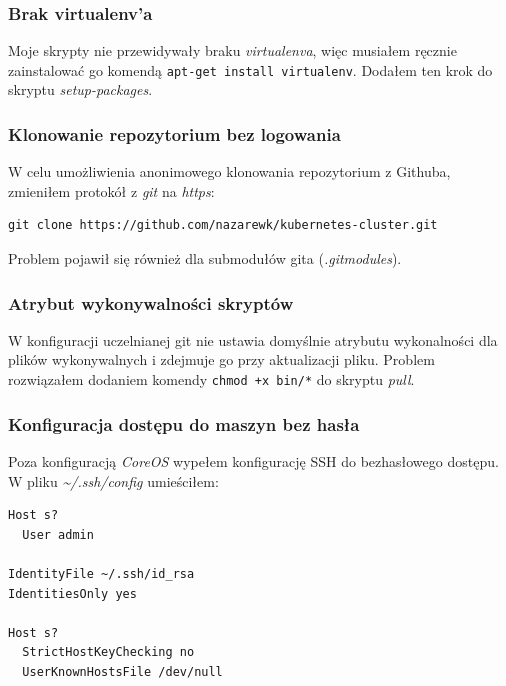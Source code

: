 \documentclass[a4paper,12pt,twoside,openany]{report}
\newcommand{\passthrough}[1]{#1}
\begin{document}
\hypertarget{brak-virtualenva}{%
\subsubsection{Brak virtualenv'a}\label{brak-virtualenva}}

Moje skrypty nie przewidywały braku \emph{virtualenva}, więc musiałem
ręcznie zainstalować go komendą
\passthrough{\lstinline!apt-get install virtualenv!}. Dodałem ten krok
do skryptu \emph{setup-packages}.

\hypertarget{klonowanie-repozytorium-bez-logowania}{%
\subsubsection{Klonowanie repozytorium bez
logowania}\label{klonowanie-repozytorium-bez-logowania}}

W celu umożliwienia anonimowego klonowania repozytorium z Githuba,
zmieniłem protokół z \emph{git} na \emph{https}:

\begin{lstlisting}
git clone https://github.com/nazarewk/kubernetes-cluster.git
\end{lstlisting}

Problem pojawił się również dla submodułów gita (\emph{.gitmodules}).

\hypertarget{atrybut-wykonywalnoux15bci-skryptuxf3w}{%
\subsubsection{Atrybut wykonywalności
skryptów}\label{atrybut-wykonywalnoux15bci-skryptuxf3w}}

W konfiguracji uczelnianej git nie ustawia domyślnie atrybutu
wykonalności dla plików wykonywalnych i zdejmuje go przy aktualizacji
pliku. Problem rozwiązałem dodaniem komendy
\passthrough{\lstinline!chmod +x bin/*!} do skryptu \emph{pull}.

\hypertarget{konfiguracja-dostux119pu-do-maszyn-bez-hasux142a}{%
\subsubsection{Konfiguracja dostępu do maszyn bez
hasła}\label{konfiguracja-dostux119pu-do-maszyn-bez-hasux142a}}

Poza konfiguracją \emph{CoreOS} wypełem konfigurację SSH do bezhasłowego
dostępu. W pliku \emph{\textasciitilde{}/.ssh/config} umieściłem:

\begin{lstlisting}
Host s?
  User admin
  
IdentityFile ~/.ssh/id_rsa
IdentitiesOnly yes

Host s?
  StrictHostKeyChecking no
  UserKnownHostsFile /dev/null
\end{lstlisting}
\end{document}
